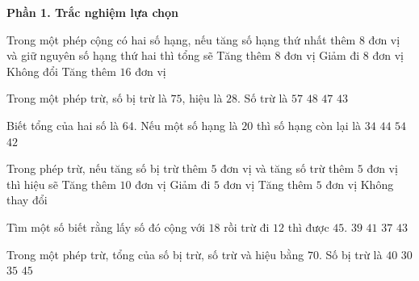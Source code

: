 \textbf{Phần 1. Trắc nghiệm lựa chọn}

\begin{ex} %
Trong một phép cộng có hai số hạng, nếu tăng số hạng thứ nhất thêm $8$ đơn vị và giữ nguyên số hạng thứ hai thì tổng sẽ
\choice
{\True Tăng thêm $8$ đơn vị}
{Giảm đi $8$ đơn vị}
{Không đổi}
{Tăng thêm $16$ đơn vị}
\end{ex}

\begin{ex} %
Trong một phép trừ, số bị trừ là $75$, hiệu là $28$. Số trừ là
\choice
{$57$}
{$48$}
{\True $47$}
{$43$}
\end{ex}

\begin{ex} %
Biết tổng của hai số là $64$. Nếu một số hạng là $20$ thì số hạng còn lại là
\choice
{$34$}
{\True $44$}
{$54$}
{$42$}
\end{ex}

\begin{ex} %
Trong phép trừ, nếu tăng số bị trừ thêm $5$ đơn vị và tăng số trừ thêm $5$ đơn vị thì hiệu sẽ
\choice
{Tăng thêm $10$ đơn vị}
{Giảm đi $5$ đơn vị}
{Tăng thêm $5$ đơn vị}
{\True Không thay đổi}
\end{ex}

\begin{ex} %
Tìm một số biết rằng lấy số đó cộng với $18$ rồi trừ đi $12$ thì được $45$.
\choice
{\True $39$}
{$41$}
{$37$}
{$43$}
\end{ex}

\begin{ex} %
Trong một phép trừ, tổng của số bị trừ, số trừ và hiệu bằng $70$. Số bị trừ là
\choice
{$40$}
{$30$}
{\True $35$}
{$45$}
\end{ex}

